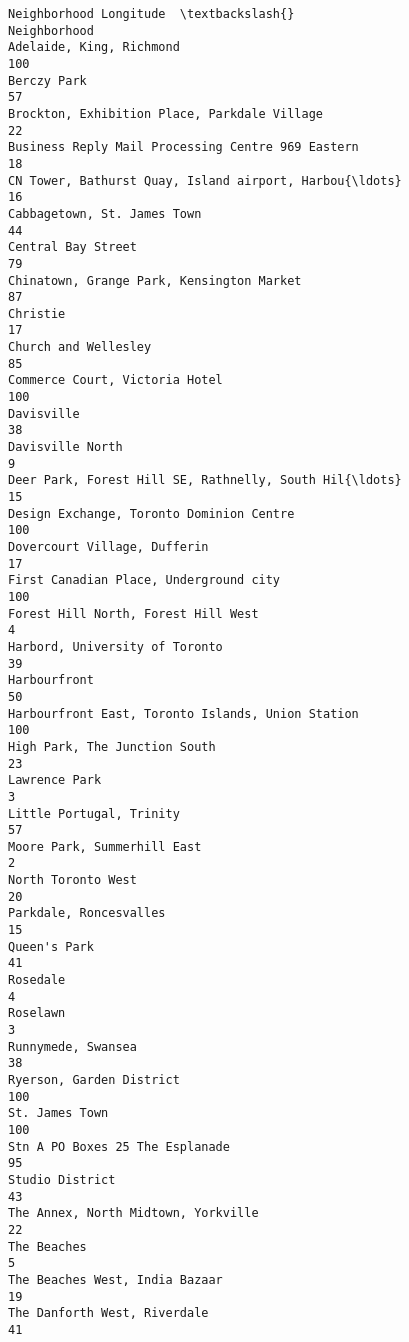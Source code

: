 \documentclass[11pt]{article}
\begin{document}
\begin{tcolorbox}[breakable, size=fbox, boxrule=.5pt, pad at break*=1mm, opacityfill=0]
\begin{Verbatim}[commandchars=\\\{\}]
                                                    Neighborhood Longitude  \textbackslash{}
Neighborhood
Adelaide, King, Richmond                                               100
Berczy Park                                                             57
Brockton, Exhibition Place, Parkdale Village                            22
Business Reply Mail Processing Centre 969 Eastern                       18
CN Tower, Bathurst Quay, Island airport, Harbou{\ldots}                      16
Cabbagetown, St. James Town                                             44
Central Bay Street                                                      79
Chinatown, Grange Park, Kensington Market                               87
Christie                                                                17
Church and Wellesley                                                    85
Commerce Court, Victoria Hotel                                         100
Davisville                                                              38
Davisville North                                                         9
Deer Park, Forest Hill SE, Rathnelly, South Hil{\ldots}                      15
Design Exchange, Toronto Dominion Centre                               100
Dovercourt Village, Dufferin                                            17
First Canadian Place, Underground city                                 100
Forest Hill North, Forest Hill West                                      4
Harbord, University of Toronto                                          39
Harbourfront                                                            50
Harbourfront East, Toronto Islands, Union Station                      100
High Park, The Junction South                                           23
Lawrence Park                                                            3
Little Portugal, Trinity                                                57
Moore Park, Summerhill East                                              2
North Toronto West                                                      20
Parkdale, Roncesvalles                                                  15
Queen's Park                                                            41
Rosedale                                                                 4
Roselawn                                                                 3
Runnymede, Swansea                                                      38
Ryerson, Garden District                                               100
St. James Town                                                         100
Stn A PO Boxes 25 The Esplanade                                         95
Studio District                                                         43
The Annex, North Midtown, Yorkville                                     22
The Beaches                                                              5
The Beaches West, India Bazaar                                          19
The Danforth West, Riverdale                                            41


\end{Verbatim}
\end{tcolorbox}
\end{document}
